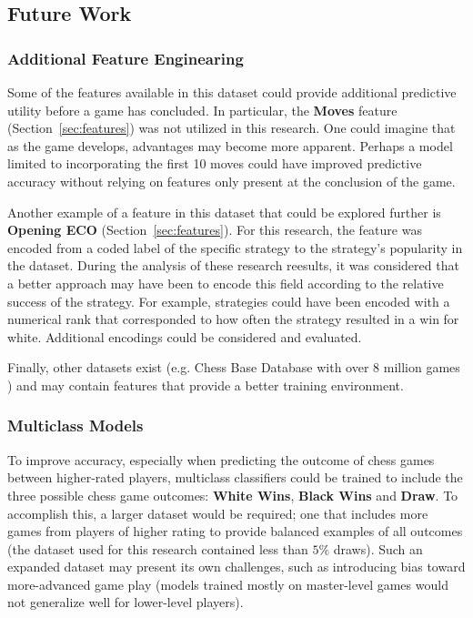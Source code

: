 \documentclass[12pt]{article}
\begin{document}
\subsection{Future Work}

\subsubsection{Additional Feature Enginearing}
\label{sec:feature-eng}
Some of the features available in this dataset could provide additional predictive utility before a game has concluded. In particular, the \textbf{Moves} feature (Section~\ref{sec:features}) was not utilized in this research. One could imagine that as the game develops, advantages may become more apparent. Perhaps a model limited to incorporating the first 10 moves could have improved predictive accuracy without relying on features only present at the conclusion of the game.

Another example of a feature in this dataset that could be explored further is \textbf{Opening ECO} (Section~\ref{sec:features}). For this research, the feature was encoded from a coded label of the specific strategy to the strategy's popularity in the dataset. During the analysis of these research reesults, it was considered that a better approach may have been to encode this field according to the relative success of the strategy. For example, strategies could have been encoded with a numerical rank that corresponded to how often the strategy resulted in a win for white. Additional encodings could be considered and evaluated.

Finally, other datasets exist (e.g. Chess Base Database with over 8 million games \cite{chessBaseDb}) and may contain features that provide a better training environment.

\subsubsection{Multiclass Models}
\label{sec:multiclass}
To improve accuracy, especially when predicting the outcome of chess games between higher-rated players, multiclass classifiers could be trained to include the three possible chess game outcomes: \textbf{White Wins}, \textbf{Black Wins} and \textbf{Draw}. To accomplish this, a larger dataset would be required; one that includes more games from players of higher rating to provide balanced examples of all outcomes (the dataset used for this research contained less than $5\%$ draws). Such an expanded dataset may present its own challenges, such as introducing bias toward more-advanced game play (models trained mostly on master-level games would not generalize well for lower-level players).
\end{document}
